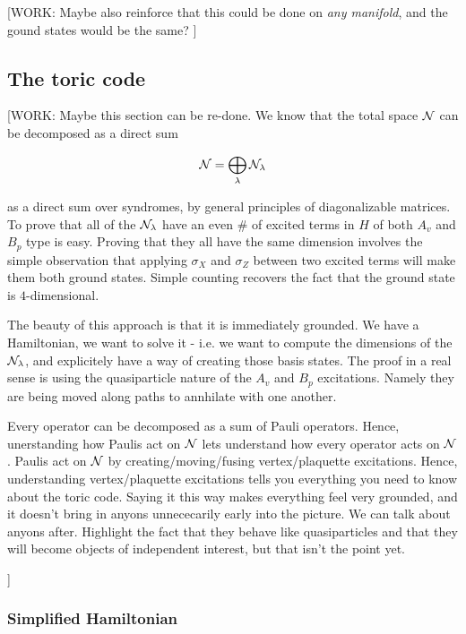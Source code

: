 [WORK: Maybe also reinforce that this could be done on \textit{any manifold}, and the gound states would be the same? ]

\subsection{The toric code}

[WORK: Maybe this section can be re-done. We know that the total space $\mathcal{N}$ can be decomposed as a direct sum

$$\mathcal{N}=\bigoplus_{\lambda}\mathcal{N}_\lambda$$

as a direct sum over syndromes, by general principles of diagonalizable matrices. To prove that all of the $\mathcal{N}_\lambda$  have an even $\#$ of excited terms in $H$ of both $A_v$ and $B_p$ type is easy. Proving that they all have the same dimension involves the simple observation that applying $\sigma_X$ and $\sigma_Z$ between two excited terms will make them both ground states. Simple counting recovers the fact that the ground state is $4$-dimensional.

The beauty of this approach is that it is immediately grounded. We have a Hamiltonian, we want to solve it - i.e. we want to compute the dimensions of the $\mathcal{N}_\lambda$, and explicitely have a way of creating those basis states. The proof in a real sense is using the quasiparticle nature of the $A_v$ and $B_p$ excitations. Namely they are being moved along paths to annhilate with one another.

Every operator can be decomposed as a sum of Pauli operators. Hence, unerstanding how Paulis act on $\mathcal{N}$ lets understand how every operator acts on $\mathcal{N}$. Paulis act on $\mathcal{N}$ by creating/moving/fusing vertex/plaquette excitations. Hence, understanding vertex/plaquette excitations tells you everything you need to know about the toric code. Saying it this way makes everything feel very grounded, and it doesn't bring in anyons unnececarily early into the picture. We can talk about anyons after. Highlight the fact that they behave like quasiparticles and that they will become objects of independent interest, but that isn't the point yet.

]

\subsubsection{Simplified Hamiltonian}

